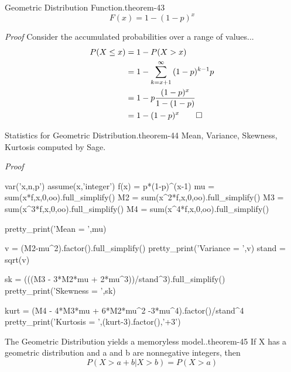 \documentclass[10pt,]{book}
\makeatletter
\renewcommand*{\proofname}{Proof}
\renewenvironment{proof}[1][\proofname]{\par
  \pushQED{\qed}%
  \normalfont \topsep6\p@\@plus6\p@\relax
  \trivlist
  \item\relax
    {\itshape
    #1\@addpunct{.}}\hspace\labelsep\ignorespaces
}{%
  \popQED\endtrivlist\@endpefalse
}
\numberwithin{equation}{section}
\newcommand{\gt}{>}
\makeatother
\begin{document}
%
\par
\hypertarget{p-887}{}%
\begin{theorem}{Geometric Distribution Function.}{}{theorem-43}%
\hypertarget{p-888}{}%
%
\begin{equation*}
F(x) =  1- (1-p)^{x}
\end{equation*}
%
\end{theorem}
\begin{proof}\hypertarget{proof-45}{}
\hypertarget{p-889}{}%
Consider the accumulated probabilities over a range of values...%
\begin{align*}
P(X \le x) & = 1 - P(X \gt x)\\
& = 1- \sum_{k={x+1}}^{\infty} {(1-p)^{k-1}p}\\
& = 1- p \frac{(1-p)^{x}}{1-(1-p)}\\
& = 1- (1-p)^{x}\qedhere
\end{align*}
%
\end{proof}
%
\par
\hypertarget{p-890}{}%
\begin{theorem}{Statistics for Geometric Distribution.}{}{theorem-44}%
\hypertarget{p-891}{}%
Mean, Variance, Skewness, Kurtosis computed by Sage.%
\end{theorem}
\begin{proof}\hypertarget{proof-46}{}
\hypertarget{p-892}{}%
\leavevmode%
\begin{sageinput}
var('x,n,p')
assume(x,'integer')
f(x) = p*(1-p)^(x-1)
mu = sum(x*f,x,0,oo).full_simplify()
M2 = sum(x^2*f,x,0,oo).full_simplify()
M3 = sum(x^3*f,x,0,oo).full_simplify()
M4 = sum(x^4*f,x,0,oo).full_simplify()

pretty_print('Mean = ',mu)

v = (M2-mu^2).factor().full_simplify()
pretty_print('Variance = ',v)
stand = sqrt(v)

sk = (((M3 - 3*M2*mu + 2*mu^3))/stand^3).full_simplify()
pretty_print('Skewness = ',sk)

kurt = (M4 - 4*M3*mu + 6*M2*mu^2 -3*mu^4).factor()/stand^4
pretty_print('Kurtosis = ',(kurt-3).factor(),'+3')
\end{sageinput}
%
\end{proof}
%
\par
\hypertarget{p-893}{}%
\begin{theorem}{The Geometric Distribution yields a memoryless model..}{}{theorem-45}%
\hypertarget{p-894}{}%
If X has a geometric distribution and a and b are nonnegative integers, then%
\begin{equation*}
P( X > a + b | X > b ) = P( X > a)
\end{equation*}
%
\end{theorem}
\end{document}
